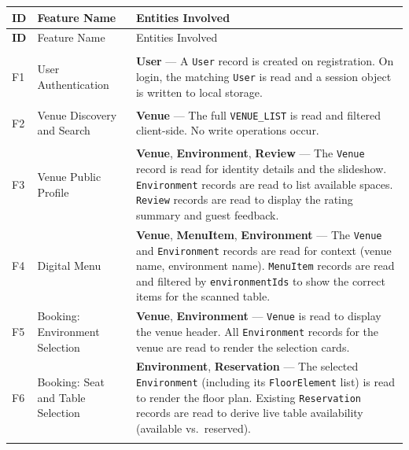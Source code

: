 \documentclass[12pt,a4paper]{article}
\begin{document}
\begin{longtable}{>{\bfseries}l L{4.5cm} L{7.5cm}}
    \toprule
    ID & Feature Name & Entities Involved \\
    \midrule
    \endfirsthead
    \toprule
    ID & Feature Name & Entities Involved \\
    \midrule
    \endhead
    \midrule
     \\
    \endfoot
    \bottomrule
    \endlastfoot

    F1 &
    User Authentication &
    \textbf{User} ---
    A \texttt{User} record is created on registration. On login, the
    matching \texttt{User} is read and a session object is written to
    local storage. \\
    \addlinespace

    F2 &
    Venue Discovery and Search &
    \textbf{Venue} ---
    The full \texttt{VENUE\_LIST} is read and filtered client-side.
    No write operations occur. \\
    \addlinespace

    F3 &
    Venue Public Profile &
    \textbf{Venue}, \textbf{Environment}, \textbf{Review} ---
    The \texttt{Venue} record is read for identity details and the
    slideshow. \texttt{Environment} records are read to list available
    spaces. \texttt{Review} records are read to display the rating
    summary and guest feedback. \\
    \addlinespace

    F4 &
    Digital Menu &
    \textbf{Venue}, \textbf{MenuItem}, \textbf{Environment} ---
    The \texttt{Venue} and \texttt{Environment} records are read for
    context (venue name, environment name). \texttt{MenuItem} records
    are read and filtered by \texttt{environmentIds} to show the
    correct items for the scanned table. \\
    \addlinespace

    F5 &
    Booking: Environment Selection &
    \textbf{Venue}, \textbf{Environment} ---
    \texttt{Venue} is read to display the venue header.
    All \texttt{Environment} records for the venue are read to render
    the selection cards. \\
    \addlinespace

    F6 &
    Booking: Seat and Table Selection &
    \textbf{Environment}, \textbf{Reservation} ---
    The selected \texttt{Environment} (including its
    \texttt{FloorElement} list) is read to render the floor plan.
    Existing \texttt{Reservation} records are read to derive live
    table availability (available vs.\ reserved). \\
    \addlinespace


\end{longtable}
\end{document}
